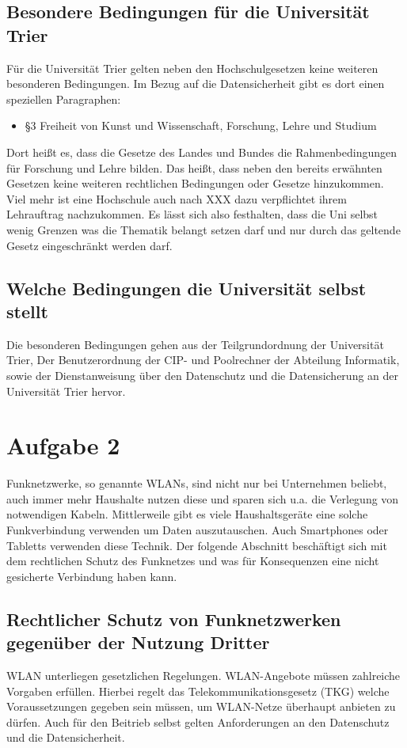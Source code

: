 \documentclass[10pt,a4paper]{article}
\begin{document}
\subsection*{Besondere Bedingungen für die Universität Trier}
Für die Universität Trier gelten neben den Hochschulgesetzen keine weiteren besonderen Bedingungen. Im Bezug auf die Datensicherheit gibt es dort einen speziellen Paragraphen:
\begin{itemize}
	\item §3 Freiheit von Kunst und Wissenschaft, Forschung, Lehre und Studium
\end{itemize}
Dort heißt es, dass die Gesetze des Landes und Bundes die Rahmenbedingungen für Forschung und Lehre bilden. Das heißt, dass neben den bereits erwähnten Gesetzen keine weiteren rechtlichen Bedingungen oder Gesetze hinzukommen. Viel mehr ist eine Hochschule auch nach XXX dazu verpflichtet ihrem Lehrauftrag nachzukommen. Es lässt sich also festhalten, dass die Uni selbst wenig Grenzen was die Thematik belangt setzen darf und nur durch das geltende Gesetz eingeschränkt werden darf.

\subsection*{Welche Bedingungen die Universität selbst stellt}
Die besonderen Bedingungen gehen aus der Teilgrundordnung der Universität Trier, Der Benutzerordnung der CIP- und Poolrechner der Abteilung Informatik, sowie der Dienstanweisung über den Datenschutz und die Datensicherung an der Universität Trier hervor.

\section*{Aufgabe 2}
Funknetzwerke, so genannte WLANs, sind nicht nur bei Unternehmen beliebt, auch immer mehr Haushalte nutzen diese und sparen sich u.a. die Verlegung von notwendigen Kabeln. Mittlerweile gibt es viele Haushaltsgeräte eine solche Funkverbindung verwenden um Daten auszutauschen. Auch Smartphones oder Tabletts verwenden diese Technik. Der folgende Abschnitt beschäftigt sich mit dem rechtlichen Schutz des Funknetzes und was für Konsequenzen eine nicht gesicherte Verbindung haben kann.

\subsection*{Rechtlicher Schutz von Funknetzwerken gegenüber der Nutzung Dritter}
WLAN unterliegen gesetzlichen Regelungen. WLAN-Angebote müssen zahlreiche Vorgaben erfüllen. Hierbei regelt das Telekommunikationsgesetz (TKG) welche Voraussetzungen gegeben sein müssen, um WLAN-Netze überhaupt anbieten zu dürfen. Auch für den Beitrieb selbst gelten Anforderungen an den Datenschutz und die Datensicherheit.
 
\end{document}
